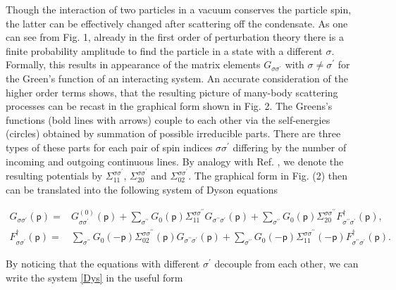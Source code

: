 \documentclass[reprint,superscriptaddress,showpacs,nofootinbib,aps,pra]{revtex4-1}
\begin{document}
Though the interaction of two particles in a vacuum conserves the particle spin, the latter can be effectively changed after scattering off the condensate. As one can see from Fig. 1, already in the first order of perturbation theory there is a finite probability amplitude to find the particle in a state with a different $\sigma$. Formally, this results in appearance of the matrix elements $G_{\sigma\sigma^\prime}$ with $\sigma\neq\sigma^\prime$ for the Green's function of an interacting system. An accurate consideration of the higher order terms shows, that the resulting picture of many-body scattering processes can be recast in the graphical form shown in Fig. 2. The Greens's functions (bold lines with arrows) couple to each other via the self-energies (circles) obtained by summation of possible irreducible parts. There are three types of these parts for each pair of spin indices $\sigma\sigma^\prime$ differing by the number of incoming and outgoing continuous lines. By analogy with Ref. \cite{Beliaev}, we denote the resulting potentials by $\Sigma^{\sigma \sigma^{\prime}}_{11}$, $\Sigma^{\sigma \sigma^{\prime}}_{20}$ and $\Sigma^{\sigma \sigma^{\prime}}_{02}$. The graphical form in Fig. (2) then can be translated into the following system of Dyson equations
\begin{widetext}
\begin{subequations} \label{Dys}
\begin{align}
  G_{\sigma \sigma^\prime}(\mathsf p)=& G^{(0)}_{\sigma \sigma^\prime}(\mathsf p) + \sum_{\sigma^{\prime\prime}} G_{0}(\mathsf p) \Sigma^{\sigma \sigma^{\prime\prime}}_{11} G_{\sigma^{\prime\prime} \sigma^\prime}(\mathsf p) + \sum_{\sigma^{\prime\prime}} G_{0}(\mathsf p) \Sigma^{\sigma \sigma^{\prime\prime}}_{20} F^\dag_{\sigma^{\prime\prime} \sigma^\prime}(\mathsf p), \\ 
  F^\dag_{\sigma \sigma^\prime}(\mathsf p)=& \sum_{\sigma^{\prime\prime}} G_{0}(-\mathsf p) \Sigma^{\sigma \sigma^{\prime\prime}}_{02}(\mathsf p) G_{\sigma^{\prime\prime} \sigma^\prime}(\mathsf p) + \sum_{\sigma^{\prime\prime}} G_{0}(-\mathsf p) \Sigma^{\sigma \sigma^{\prime\prime}}_{11}(-\mathsf p) F^\dag_{\sigma^{\prime\prime} \sigma^\prime}(\mathsf p).
  \end{align}
\end{subequations}
\end{widetext}
By noticing that the equations with different $\sigma^\prime$ decouple from each other, we can write the system \eqref{Dys} in the useful form
\end{document}
